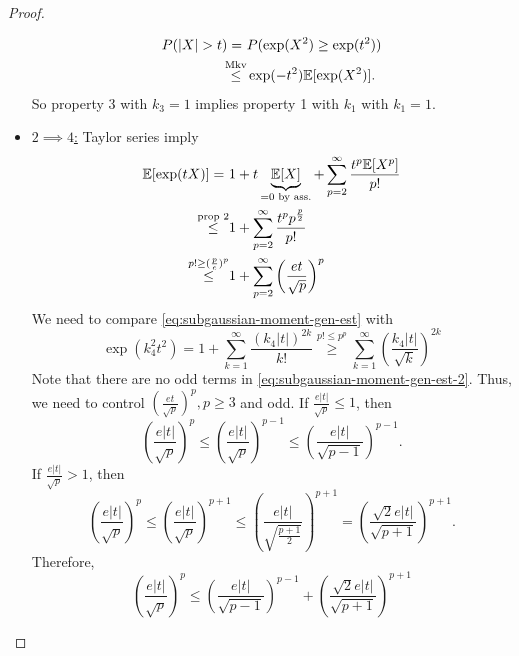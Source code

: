 \begin{lemma}
\begin{proof}
\begin{itemize}
\begin{equation*}
\begin{split}
P(|X|>t) =\  & P(\exp(X^2)\geq \exp(t^2)) \\
\overset{\text{Mkv}}\leq & \exp(-t^2) \E[\exp(X^2)].
\end{split}
\end{equation*}
So property 3 with $k_3=1$ implies property 1 with $k_1$ with $k_1=1$.
\item \underline{$2\implies 4$:} Taylor series imply
\begin{equation}\label{eq:subgaussian-moment-gen-est}
\begin{split}
\mathbb{E}[\exp(tX)] =\  & 1+ t \underbrace{\mathbb{E}[X]}_{=0 \text{ by ass.}} + \sum_{p=2}^\infty \frac{t^p \mathbb{E}[X^p]}{p!}\\
\overset{\text{prop 2}}\leq & 1 + \sum_{p=2}^\infty \frac{t^p p^{\frac{p}{2}}}{p!} \\
\overset{p!\geq (\frac{p}{e})^p}\leq & 1+ \sum_{p=2}^\infty \left(
\frac{et}{\sqrt{p}}
\right)^p
\end{split}
\end{equation}
We need to compare \eqref{eq:subgaussian-moment-gen-est} with
\begin{equation}\label{eq:subgaussian-moment-gen-est-2}
\exp(k_4^2t^2) = 1 + \sum_{k=1}^\infty \frac{(k_4|t|)^{2k}}{k!} \overset{p!\leq p^p}{\geq} \sum_{k=1}^\infty \left( 
\frac{k_4|t|}{\sqrt{k}}
\right)^{2k}
\end{equation}
Note that there are no odd terms in \eqref{eq:subgaussian-moment-gen-est-2}. Thus, we need to control $\left(\frac{et}{\sqrt{p}}\right)^p, p\geq 3$ and odd. If $\frac{e|t|}{\sqrt{p}} \leq 1$, then
\begin{equation*}
\left(\frac{e|t|}{\sqrt{p}} \right)^p \leq \left(\frac{e|t|}{\sqrt{p}} \right)^{p-1} \leq \left(\frac{e|t|}{\sqrt{p-1}} \right)^{p-1}.
\end{equation*}
 If $\frac{e|t|}{\sqrt{p}} > 1$, then
 \begin{equation*}
 \left(\frac{e|t|}{\sqrt{p}} \right)^p \leq \left(\frac{e|t|}{\sqrt{p}} \right)^{p+1} \leq  \left(\frac{e|t|}{\sqrt{\frac{p+1}{2}}} \right)^{p+1} = \left(\frac{\sqrt{2}e|t|}{\sqrt{p+1}}
 \right)^{p+1}.
 \end{equation*}
 Therefore,
 \begin{equation}\label{eq:subgaussian:equiv:odd:help}
 \left(\frac{e|t|}{\sqrt{p}} \right)^p \leq \left(\frac{e|t|}{\sqrt{p-1}} \right)^{p-1}+ \left(\frac{\sqrt{2}e|t|}{\sqrt{p+1}}
 \right)^{p+1}
 \end{equation}

\end{itemize}
\end{proof}
\end{lemma}
